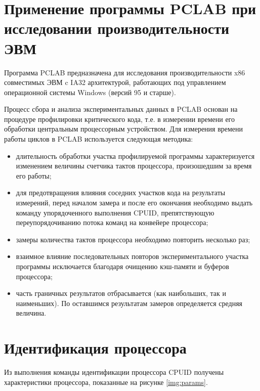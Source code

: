\chapter{Применение программы PCLAB при исследовании производительности ЭВМ}

Программа PCLAB предназначена для исследования производительности x86 совместимых ЭВМ c IA32 архитектурой, работающих под управлением операционной системы Windows (версий 95 и старше).

Процесс сбора и анализа экспериментальных данных в PCLAB основан на процедуре профилировки критического кода, т.е. в измерении времени его обработки центральным процессорным устройством. Для измерения времени работы циклов в PCLAB используется следующая методика:

\begin{itemize}
	\item длительность обработки участка профилируемой программы характеризуется изменением величины счетчика тактов процессора, произошедшим за время его работы;
	\item для предотвращения влияния соседних участков кода на результаты измерений, перед началом замера и после его окончания необходимо выдать команду упорядоченного
выполнения CPUID, препятствующую переупорядочиванию потока команд на конвейере процессора;
	\item замеры количества тактов процессора необходимо повторить несколько раз;
	\item взаимное влияние последовательных повторов экспериментального участка программы исключается благодаря очищению кэш-памяти и буферов процессора;
	\item часть граничных результатов отбрасывается (как наибольших, так и наименьших). По оставшимся результатам замеров определяется средняя величина.
\end{itemize}

\chapter{Идентификация процессора}

Из выполнения команды идентификации процессора CPUID получены характеристики процессора, показанные на рисунке \ref{img:params}.

